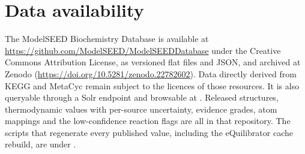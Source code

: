 \section{Data availability}

The ModelSEED Biochemistry Database is available at \url{https://github.com/ModelSEED/ModelSEEDDatabase} under the Creative Commons Attribution License, as versioned flat files and JSON, and archived at Zenodo (\url{https://doi.org/10.5281/zenodo.22782602}). Data directly derived from KEGG and MetaCyc remain subject to the licences of those resources. It is also queryable through a Solr endpoint and browsable at \modelseedurl. Released structures, thermodynamic values with per-source uncertainty, evidence grades, atom mappings and the low-confidence reaction flags are all in that repository. The scripts that regenerate every published value, including the eQuilibrator cache rebuild, are under .
